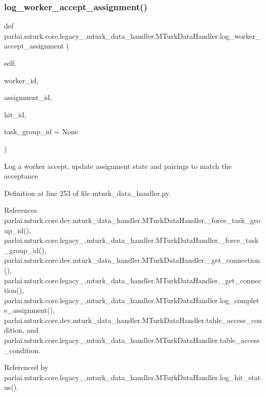 \subsubsection{\texorpdfstring{log\+\_\+worker\+\_\+accept\+\_\+assignment()}{log\_worker\_accept\_assignment()}}
{\footnotesize\ttfamily def parlai.\+mturk.\+core.\+legacy\+\_.\+mturk\+\_\+data\+\_\+handler.\+M\+Turk\+Data\+Handler.\+log\+\_\+worker\+\_\+accept\+\_\+assignment (\begin{DoxyParamCaption}\item[{}]{self,  }\item[{}]{worker\+\_\+id,  }\item[{}]{assignment\+\_\+id,  }\item[{}]{hit\+\_\+id,  }\item[{}]{task\+\_\+group\+\_\+id = {\ttfamily None} }\end{DoxyParamCaption})}

\begin{DoxyVerb}Log a worker accept, update assignment state and pairings to match
the acceptance
\end{DoxyVerb}
 

Definition at line 253 of file mturk\+\_\+data\+\_\+handler.\+py.



References parlai.\+mturk.\+core.\+dev.\+mturk\+\_\+data\+\_\+handler.\+M\+Turk\+Data\+Handler.\+\_\+force\+\_\+task\+\_\+group\+\_\+id(), parlai.\+mturk.\+core.\+legacy\+\_.\+mturk\+\_\+data\+\_\+handler.\+M\+Turk\+Data\+Handler.\+\_\+force\+\_\+task\+\_\+group\+\_\+id(), parlai.\+mturk.\+core.\+dev.\+mturk\+\_\+data\+\_\+handler.\+M\+Turk\+Data\+Handler.\+\_\+get\+\_\+connection(), parlai.\+mturk.\+core.\+legacy\+\_.\+mturk\+\_\+data\+\_\+handler.\+M\+Turk\+Data\+Handler.\+\_\+get\+\_\+connection(), parlai.\+mturk.\+core.\+legacy\+\_.\+mturk\+\_\+data\+\_\+handler.\+M\+Turk\+Data\+Handler.\+log\+\_\+complete\+\_\+assignment(), parlai.\+mturk.\+core.\+dev.\+mturk\+\_\+data\+\_\+handler.\+M\+Turk\+Data\+Handler.\+table\+\_\+access\+\_\+condition, and parlai.\+mturk.\+core.\+legacy\+\_.\+mturk\+\_\+data\+\_\+handler.\+M\+Turk\+Data\+Handler.\+table\+\_\+access\+\_\+condition.



Referenced by parlai.\+mturk.\+core.\+legacy\+\_.\+mturk\+\_\+data\+\_\+handler.\+M\+Turk\+Data\+Handler.\+log\+\_\+hit\+\_\+status().

